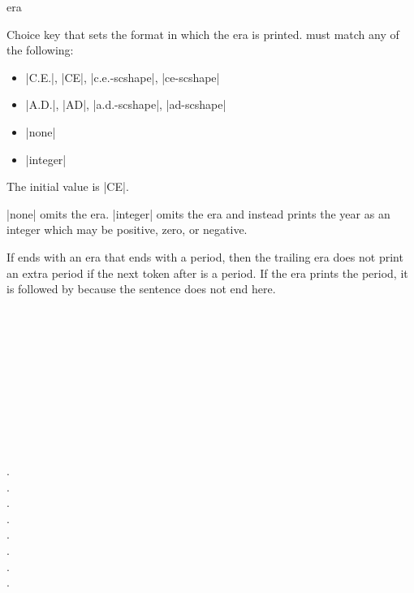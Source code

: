\documentclass{beerydoc}
\begin{document}
\begin{codedoc}{era}
  \begin{syntax}
  \end{syntax}
  Choice key that sets the format in which the era is printed.
   must match any of the following:
  \begin{itemize}
    \item |C.E.|, |CE|, |c.e.-scshape|, |ce-scshape|
    \item |A.D.|, |AD|, |a.d.-scshape|, |ad-scshape|
    \item |none|
    \item |integer|
  \end{itemize}
  The initial value is |CE|.

  |none| omits the era.
  |integer| omits the era and instead prints the year as an integer which may
  be positive, zero, or negative.

  If  ends with an era that ends with a period, then the
  trailing era does not print an extra period if the next token after
   is a period.
  If the era prints the period, it is followed by  because the sentence
  does not end here.
  \begin{codedemo}
    \\
    \\
    \\
    \\
    \\
    \\
    \\
    \\
    \\
  \end{codedemo}
\end{codedoc}

\begin{codedemo}
  .\\
  .\\
  .\\
  .\\
  .\\
  .\\
  .\\
  .
\end{codedemo}
\end{document}
